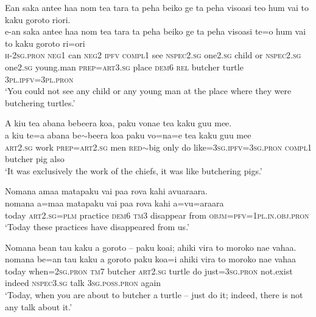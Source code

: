 \ea\label{ex:text19-32}
Ean saka antee haa nom tea tara ta peha beiko ge ta peha visoasi teo hum vai to kaku goroto riori.\\
\gll e-an	saka	antee	haa	nom	tea	tara	ta	peha	beiko	ge	ta	peha	visoasi	te=o	hum	vai	to	kaku	goroto	ri=ori\\
     \textsc{h}-2\textsc{sg}.\textsc{pron}	\textsc{neg}1	can	\textsc{neg}2	\textsc{ipfv}	\textsc{compl}1	see	\textsc{nspec}2.\textsc{sg}	one2.\textsc{sg}	child	or	\textsc{nspec}2.\textsc{sg}	one2.\textsc{sg}	young.man	\textsc{prep}=\textsc{art}3.\textsc{sg}	place	\textsc{dem}6	\textsc{rel}	butcher	turtle	3\textsc{pl}.\textsc{ipfv}=3\textsc{pl}.\textsc{pron}\\
\glt `You could not see any child or any young man at the place where they were butchering turtles.'
\z


\ea\label{ex:text19-33}
A kiu tea abana bebeera koa, paku vonae tea kaku guu mee.\\
\gll a	kiu	te=a	abana	be{$\sim$}beera	koa	paku	vo=na=e	tea	kaku	guu	mee\\
     \textsc{art}2.\textsc{sg}	work	\textsc{prep}=\textsc{art}2.\textsc{sg}	men	\textsc{red}{$\sim$}big	only	do	like=3\textsc{sg}.\textsc{ipfv}=3\textsc{sg}.\textsc{pron}	\textsc{compl}1	butcher	pig	also\\
\glt `It was exclusively the work of the chiefs, it was like butchering pigs.'
\z

\ea\label{ex:text19-34}
Nomana amaa matapaku vai paa rova kahi avuaraara.\\
\gll nomana	a=maa	matapaku	vai	paa	rova	kahi	a=vu=araara\\
     today	\textsc{art}2.\textsc{sg}=\textsc{plm}	practice	\textsc{dem}6	\textsc{tm}3	disappear	from	\textsc{objm}=\textsc{pfv}=1\textsc{pl}.\textsc{in}.\textsc{obj}.\textsc{pron}\\
\glt `Today these practices have disappeared from us.'
\z

\ea\label{ex:text19-35}
Nomana bean tau kaku a goroto -- paku koai; ahiki vira to moroko nae vahaa.\\
\gll nomana	be=an	tau	kaku	a	goroto	paku	koa=i	ahiki	vira	to	moroko	nae	vahaa\\
     today	when=2\textsc{sg}.\textsc{pron}	\textsc{tm}7	butcher	\textsc{art}2.\textsc{sg}	turtle	do	just=3\textsc{sg}.\textsc{pron}	not.exist	indeed	\textsc{nspec}3.\textsc{sg}	talk	3\textsc{sg}.\textsc{poss}.\textsc{pron}	again\\
\glt `Today, when you are about to butcher a turtle -- just do it; indeed, there is not any talk about it.'
\z

